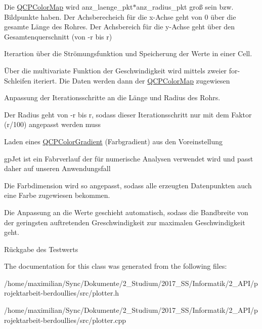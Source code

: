 Die \hyperlink{class_q_c_p_color_map}{Q\+C\+P\+Color\+Map} wird anz\+\_\+laenge\+\_\+pkt$\ast$anz\+\_\+radius\+\_\+pkt groß sein bzw. Bildpunkte haben. Der Achsberecheich für die x-\/\+Achse geht von 0 über die gesamte Länge des Rohres. Der Achsbereich für die y-\/\+Achse geht über den Gesamtenquerschnitt (von -\/r bis r)

Iterartion über die Strömungsfunktion und Speicherung der Werte in einer Cell.

Über die multivariate Funktion der Geschwindigkeit wird mittels zweier for-\/\+Schleifen iteriert. Die Daten werden dann der \hyperlink{class_q_c_p_color_map}{Q\+C\+P\+Color\+Map} zugewiesen

Anpassung der Iterationsschritte an die Länge und Radius des Rohrs.

Der Radius geht von -\/r bis r, sodass dieser Iterationsschritt nur mit dem Faktor (r/100) angepasst werden muss

Laden eines \hyperlink{class_q_c_p_color_gradient}{Q\+C\+P\+Color\+Gradient} (Farbgradient) aus den Voreinstellung

gp\+Jet ist ein Fabrverlauf der für numerische Analysen verwendet wird und passt daher auf unseren Anwendungsfall

Die Farbdimension wird so angepasst, sodass alle erzeugten Datenpunkten auch eine Farbe zugewiesen bekommen.

Die Anpassung an die Werte geschieht automatisch, sodass die Bandbreite von der geringsten auftretenden Greschwindigkeit zur maximalen Geschwindigkeit geht.

Rückgabe des Testwerts 

The documentation for this class was generated from the following files\+:\begin{DoxyCompactItemize}
\item 
/home/maximilian/\+Sync/\+Dokumente/2\+\_\+\+Studium/2017\+\_\+\+S\+S/\+Informatik/2\+\_\+\+A\+P\+I/projektarbeit-\/berdoullies/src/plotter.\+h\item 
/home/maximilian/\+Sync/\+Dokumente/2\+\_\+\+Studium/2017\+\_\+\+S\+S/\+Informatik/2\+\_\+\+A\+P\+I/projektarbeit-\/berdoullies/src/plotter.\+cpp\end{DoxyCompactItemize}
